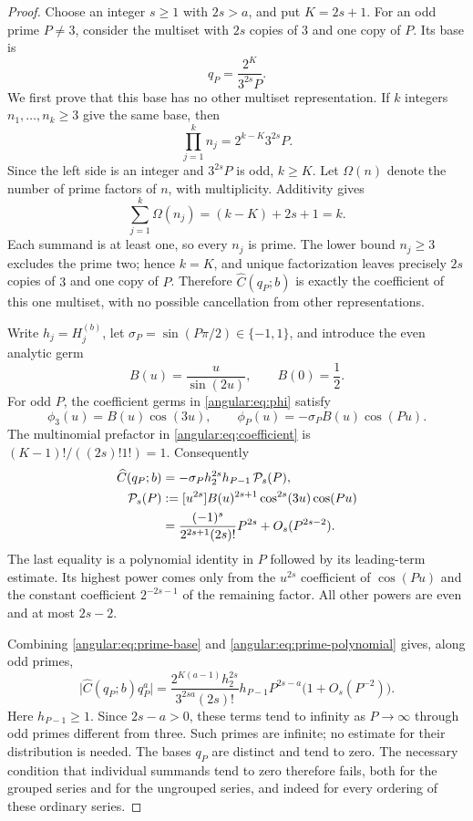 \begin{proof}
Choose an integer $s\ge1$ with $2s>a$, and put $K=2s+1$.
For an odd prime $P\ne3$, consider the multiset with $2s$ copies
of $3$ and one copy of $P$. Its base is
\begin{equation}\label{angular:eq:prime-base}
 q_P=\frac{2^K}{3^{2s}P}.
\end{equation}
We first prove that this base has no other multiset representation.
If $k$ integers $n_1,\ldots,n_k\ge3$ give the same base, then
\[
 \prod_{j=1}^k n_j=2^{k-K}3^{2s}P.
\]
Since the left side is an integer and $3^{2s}P$ is odd, $k\ge K$.
Let $\Omega(n)$ denote the number of prime factors of $n$, with
multiplicity. Additivity gives
\[
 \sum_{j=1}^k\Omega(n_j)=(k-K)+2s+1=k.
\]
Each summand is at least one, so every $n_j$ is prime. The lower
bound $n_j\ge3$ excludes the prime two; hence $k=K$, and unique
factorization leaves precisely $2s$ copies of $3$ and one copy
of $P$. Therefore $\widehat C(q_P;b)$ is exactly the coefficient
of this one multiset, with no possible cancellation from other
representations.

Write $h_j=H_j^{(b)}$, let $\sigma_P=\sin(P\pi/2)\in\{-1,1\}$,
and introduce the even analytic germ
\[
 B(u)=\frac{u}{\sin(2u)},\qquad B(0)=\frac12.
\]
For odd $P$, the coefficient germs in
\eqref{angular:eq:phi} satisfy
\[
 \phi_3(u)=B(u)\cos(3u),\qquad
 \phi_P(u)=-\sigma_P B(u)\cos(Pu).
\]
The multinomial prefactor in \eqref{angular:eq:coefficient} is
$(K-1)!/((2s)!1!)=1$. Consequently
\begin{align}
 \widehat C(q_P;b)
 &=-\sigma_Ph_2^{2s}h_{P-1}\,\mathcal P_s(P),
 \label{angular:eq:prime-coefficient}\\
 \mathcal P_s(P)
 &:=[u^{2s}]B(u)^{2s+1}\cos^{2s}(3u)\cos(Pu)
 \notag\\
 &=\frac{(-1)^s}{2^{2s+1}(2s)!}P^{2s}
     +O_s(P^{2s-2}).
 \label{angular:eq:prime-polynomial}
\end{align}
The last equality is a polynomial identity in $P$ followed by its
leading-term estimate. Its highest power comes only from the
$u^{2s}$ coefficient of $\cos(Pu)$ and the constant coefficient
$2^{-2s-1}$ of the remaining factor. All other powers are even
and at most $2s-2$.

Combining \eqref{angular:eq:prime-base} and
\eqref{angular:eq:prime-polynomial} gives, along odd primes,
\[
 \bigl|\widehat C(q_P;b)q_P^a\bigr|
 =\frac{2^{K(a-1)}h_2^{2s}}{3^{2sa}(2s)!}
   h_{P-1}P^{2s-a}\bigl(1+O_s(P^{-2})\bigr).
\]
Here $h_{P-1}\ge1$. Since $2s-a>0$, these terms tend to infinity
as $P\to\infty$ through odd primes different from three. Such
primes are infinite; no estimate for their distribution is needed.
The bases $q_P$ are distinct and tend to zero. The necessary
condition that individual summands tend to zero therefore fails,
both for the grouped series and for the ungrouped series, and
indeed for every ordering of these ordinary series.
\end{proof}

